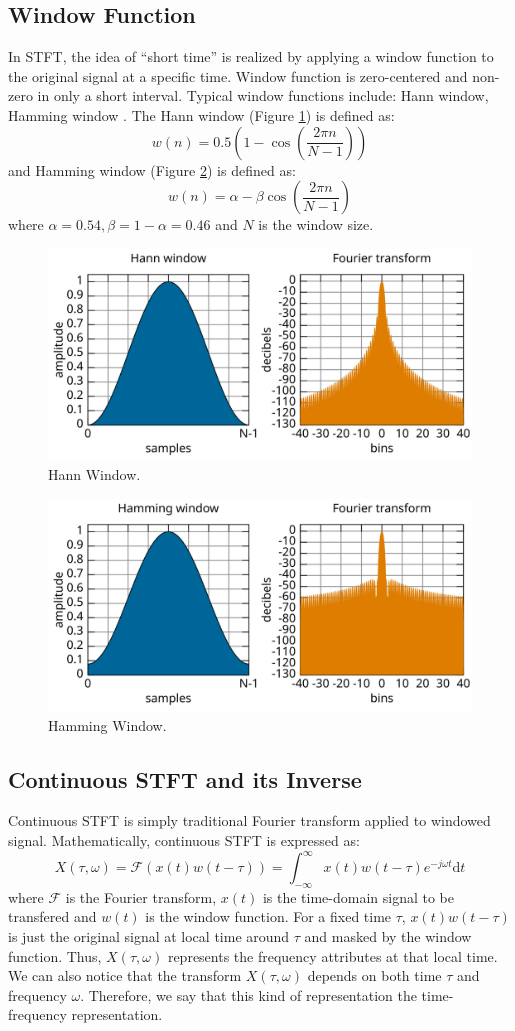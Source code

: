 \documentclass[12pt,final,twoside]{report}
\theoremstyle{plain}
\theoremstyle{definition}
\theoremstyle{remark}
\begin{document}
\subsection{Window Function}
In STFT, the idea of ``short time'' is realized by applying a window function to the original signal at a specific time. Window function is zero-centered and non-zero in only a short interval. Typical window functions include: Hann window, Hamming window \cite{heinzel_spectrum_2002}. The Hann window (Figure \ref{fig:hann}) is defined as:
\[ w(n) = 0.5 (1 - \cos(\frac{2\pi n}{N-1})) \]
and Hamming window (Figure \ref{fig:hamming}) is defined as:
\[ w(n) = \alpha - \beta \cos(\frac{2\pi n}{N-1}) \]
where $\alpha = 0.54, \beta = 1 - \alpha = 0.46$ and $N$ is the window size.

\begin{figure}[htbp]
  \centering
  \includegraphics[width=.6\textwidth]{hann}
  \caption[Hann Window]{Hann Window.}
  \label{fig:hann}
\end{figure}

\begin{figure}[htbp]
  \centering
  \includegraphics[width=.6\textwidth]{hamming}
  \caption[Hamming Window]{Hamming Window.}
  \label{fig:hamming}
\end{figure}

\subsection{Continuous STFT and its Inverse}
Continuous STFT is simply traditional Fourier transform applied to windowed signal. Mathematically, continuous STFT is expressed as:
\[ X(\tau, \omega) = \mathcal{F}(x(t)w(t-\tau)) =  \int_{-\infty}^{\infty} x(t)w(t-\tau)e^{-j\omega t}\mathrm{d}t \]
where $\mathcal{F}$ is the Fourier transform, $x(t)$ is the time-domain signal to be transfered and $w(t)$ is the window function. For a fixed time $\tau$, $x(t)w(t-\tau)$ is just the original signal at local time around $\tau$ and masked by the window function. Thus, $X(\tau, \omega)$ represents the frequency attributes at that local time. We can also notice that the transform $X(\tau, \omega)$ depends on both time $\tau$ and frequency $\omega$. Therefore, we say that this kind of representation the time-frequency representation.
\end{document}

